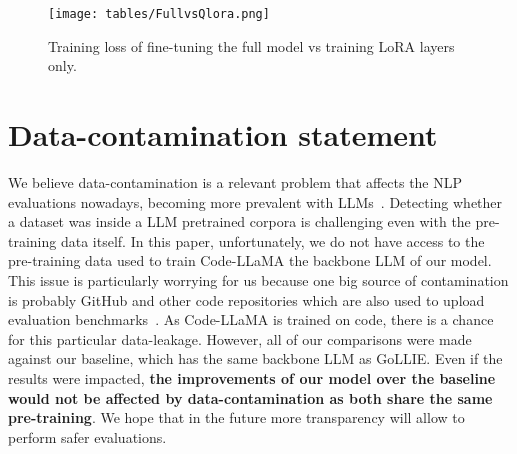 \documentclass{article} \usepackage{iclr2024_conference,times}
\begin{document}
\begin{figure}
\centering
    \caption{Training loss of fine-tuning the full model vs training LoRA layers only.}
    \texttt{[image: tables/FullvsQlora.png]}
    \label{fig:TrainingLoss}
\end{figure}


\begin{table}[htb]
\centering
\caption{F1 scores achieved when training the full model vs only training the LoRA Layers at the end of the first and third epoch.}
\small
{}
\label{tab:LoravsFullModel}
\end{table}


\section{Data-contamination statement}

We believe data-contamination is a relevant problem that affects the NLP evaluations nowadays, becoming more prevalent with LLMs~\citep{dodge-etal-2021-documenting, magar-schwartz-2022-data}. Detecting whether a dataset was inside a LLM pretrained corpora is challenging even with the pre-training data itself. In this paper, unfortunately, we do not have access to the pre-training data used to train Code-LLaMA the backbone LLM of our model. This issue is particularly worrying for us because one big source of contamination is probably GitHub and other code repositories which are also used to upload evaluation benchmarks~\cite{dodge-etal-2021-documenting}. As Code-LLaMA is trained on code, there is a chance for this particular data-leakage. However, all of our comparisons were made against our baseline, which has the same backbone LLM as GoLLIE. Even if the results were impacted, \textbf{the improvements of our model over the baseline would not be affected by data-contamination as both share the same pre-training}. We hope that in the future more transparency will allow to perform safer evaluations.
\end{document}
